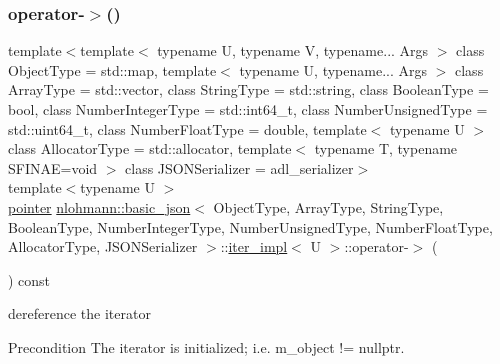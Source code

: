 \subsubsection{\texorpdfstring{operator-\/$>$()}{operator->()}}
{\footnotesize\ttfamily template$<$template$<$ typename U, typename V, typename... Args $>$ class Object\+Type = std\+::map, template$<$ typename U, typename... Args $>$ class Array\+Type = std\+::vector, class String\+Type  = std\+::string, class Boolean\+Type  = bool, class Number\+Integer\+Type  = std\+::int64\+\_\+t, class Number\+Unsigned\+Type  = std\+::uint64\+\_\+t, class Number\+Float\+Type  = double, template$<$ typename U $>$ class Allocator\+Type = std\+::allocator, template$<$ typename T, typename S\+F\+I\+N\+A\+E=void $>$ class J\+S\+O\+N\+Serializer = adl\+\_\+serializer$>$ \\
template$<$typename U $>$ \\
\hyperlink{classnlohmann_1_1basic__json_1_1iter__impl_a3dddd7fa38b36e2531700ceb4a1ce9a8}{pointer} \hyperlink{classnlohmann_1_1basic__json}{nlohmann\+::basic\+\_\+json}$<$ Object\+Type, Array\+Type, String\+Type, Boolean\+Type, Number\+Integer\+Type, Number\+Unsigned\+Type, Number\+Float\+Type, Allocator\+Type, J\+S\+O\+N\+Serializer $>$\+::\hyperlink{classnlohmann_1_1basic__json_1_1iter__impl}{iter\+\_\+impl}$<$ U $>$\+::operator-\/$>$ (\begin{DoxyParamCaption}{ }\end{DoxyParamCaption}) const\hspace{0.3cm}{\ttfamily [inline]}}



dereference the iterator 

\begin{DoxyPrecond}{Precondition}
The iterator is initialized; i.\+e. {\ttfamily m\+\_\+object != nullptr}. 
\end{DoxyPrecond}
\mbox{\label{classnlohmann_1_1basic__json_1_1iter__impl_a63c655881b0b7b7499a333ba77a7e4d1}} 
